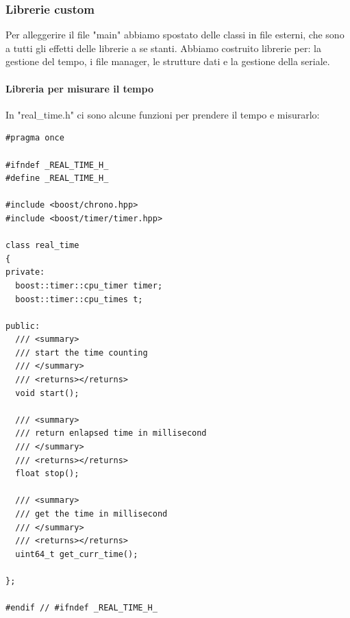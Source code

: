 \documentclass[10pt,a4paper]{article}
\begin{document}
\subsubsection{Librerie custom}
Per alleggerire il file "main" abbiamo spostato delle classi in file esterni, che sono a tutti gli effetti delle librerie a se stanti. Abbiamo costruito librerie per: la gestione del tempo, i file manager, le strutture dati e la gestione della seriale.
%
%
\paragraph{Libreria per misurare il tempo}
In "real\_time.h" ci sono alcune funzioni per prendere il tempo e misurarlo:
\begin{lstlisting}[style=mycpp, caption=librerie usate, captionpos=b]
#pragma once

#ifndef _REAL_TIME_H_
#define _REAL_TIME_H_

#include <boost/chrono.hpp>
#include <boost/timer/timer.hpp>

class real_time
{
private:
  boost::timer::cpu_timer timer;
  boost::timer::cpu_times t;

public:
  /// <summary>
  /// start the time counting
  /// </summary>
  /// <returns></returns>
  void start();

  /// <summary>
  /// return enlapsed time in millisecond
  /// </summary>
  /// <returns></returns>
  float stop();

  /// <summary>
  /// get the time in millisecond
  /// </summary>
  /// <returns></returns>
  uint64_t get_curr_time();

};

#endif // #ifndef _REAL_TIME_H_
\end{lstlisting}
%
%
\end{document}
